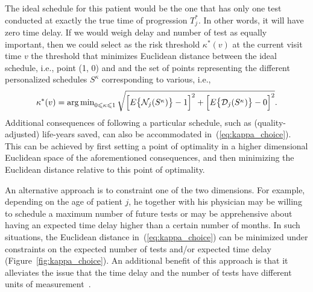 The ideal schedule for this patient would be the one that has only one test conducted at exactly the true time of progression $T^*_j$. In other words, it will have zero time delay. If we would weigh delay and number of test as equally important, then we could select as the risk threshold $\kappa^*(v)$ at the current visit time $v$ the threshold that minimizes Euclidean distance between the ideal schedule, i.e., point (1, 0) and and the set of points representing the different personalized schedules $S^{\kappa}$ corresponding to various, i.e.,
\begin{equation}
\label{eq:kappa_choice}
\kappa^*(v) = \argmin_{0 \leq \kappa \leq 1} \sqrt{\Big[E\big\{\mathcal N_j(S^\kappa)\big\} - 1\Big]^2 + \Big[E\big\{\mathcal D_j(S^\kappa )\big\} - 0\Big]^2}.
\end{equation}
Additional consequences of following a particular schedule, such as (quality-adjusted) life-years saved, can also be accommodated in~(\ref{eq:kappa_choice}). This can be achieved by first setting a point of optimality in a higher dimensional Euclidean space of the aforementioned consequences, and then minimizing the Euclidean distance relative to this point of optimality.

An alternative approach is to constraint one of the two dimensions. For example, depending on the age of patient $j$, he together with his physician may be willing to schedule a maximum number of future tests or may be apprehensive about having an expected time delay higher than a certain number of months. In such situations, the Euclidean distance in~(\ref{eq:kappa_choice}) can be minimized under constraints on the expected number of tests and/or expected time delay (Figure~\ref{fig:kappa_choice}). An additional benefit of this approach is that it alleviates the issue that the time delay and the number of tests have different units of measurement~\cite{cook1994equivalence}.